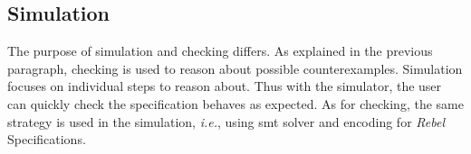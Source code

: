 \subsection{Simulation}
The purpose of simulation and checking differs. As explained in the
previous paragraph, checking is used to reason about possible counterexamples.
Simulation focuses on individual steps to reason about. Thus with the simulator,
the user can quickly check the specification behaves as expected. As for
checking, the same strategy is used in the simulation, \textit{i.e.}, using
\gls{smt} solver and encoding for \textit{Rebel} Specifications.
